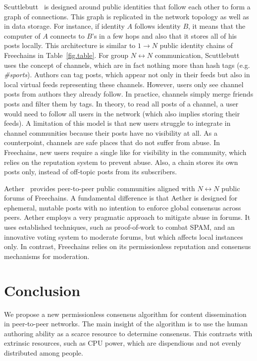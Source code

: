 \documentclass[10pt,journal,compsoc]{IEEEtran}
\newcommand{\FC}       {Freechains\xspace}
\newcommand{\Xon} {$1{\rightarrow}N$\xspace}
\newcommand{\Xnn} {$N{\leftrightarrow}N$\xspace}
\begin{document}
Scuttlebutt~\cite{p2p.scuttlebutt} is designed around public identities that
follow each other to form a graph of connections.
This graph is replicated in the network topology as well as in data storage.
For instance, if identity $A$ follows identity $B$, it means that the computer
of $A$ connects to $B$'s in a few hops and also that it stores all of his posts
locally.
This architecture is similar to \Xon public identity chains of \FC in
Table~\ref{fig.table}.
%
For group \Xnn communication, Scuttlebutt uses the concept of channels, which
are in fact nothing more than hash tags (e.g. \emph{\#sports}).
Authors can tag posts, which appear not only in their feeds but also in local
virtual feeds representing these channels.
However, users only see channel posts from authors they already follow.
In practice, channels simply merge friends posts and filter them by tags.
In theory, to read all posts of a channel, a user would need to follow all
users in the network (which also implies storing their feeds).
A limitation of this model is that new users struggle to integrate in channel
communities because their posts have no visibility at all.
As a counterpoint, channels are safe places that do not suffer from abuse.
%
In \FC, new users require a single like for visibility in the community, which
relies on the reputation system to prevent abuse.
Also, a chain stores its own posts only, instead of off-topic posts from its
subscribers.

Aether~\cite{p2p.ecosystem} provides peer-to-peer public communities aligned
with \Xnn public forums of \FC.
A fundamental difference is that Aether is designed for ephemeral, mutable
posts with no intention to enforce global consensus across peers.
Aether employs a very pragmatic approach to mitigate abuse in forums.
It uses established techniques, such as proof-of-work to combat SPAM, and an
innovative voting system to moderate forums, but which affects local instances
only.
In contrast, \FC relies on its permissionless reputation and consensus
mechanisms for moderation.

\section{Conclusion}
\label{sec.conclusion}

We propose a new permissionless consensus algorithm for content dissemination
in peer-to-peer networks.
The main insight of the algorithm is to use the human authoring ability as a
scarce resource to determine consensus.
This contrasts with extrinsic resources, such as CPU power, which are
dispendious and not evenly distributed among people.%
\end{document}
